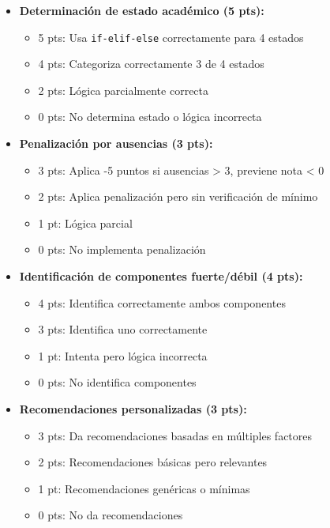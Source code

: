 \documentclass[12pt,a4paper]{article}
\begin{document}
\begin{itemize}[leftmargin=*]
    \item \textbf{Determinación de estado académico (5 pts):}
    \begin{itemize}
        \item 5 pts: Usa \texttt{if-elif-else} correctamente para 4 estados
        \item 4 pts: Categoriza correctamente 3 de 4 estados
        \item 2 pts: Lógica parcialmente correcta
        \item 0 pts: No determina estado o lógica incorrecta
    \end{itemize}
    
    \item \textbf{Penalización por ausencias (3 pts):}
    \begin{itemize}
        \item 3 pts: Aplica -5 puntos si ausencias > 3, previene nota < 0
        \item 2 pts: Aplica penalización pero sin verificación de mínimo
        \item 1 pt: Lógica parcial
        \item 0 pts: No implementa penalización
    \end{itemize}
    
    \item \textbf{Identificación de componentes fuerte/débil (4 pts):}
    \begin{itemize}
        \item 4 pts: Identifica correctamente ambos componentes
        \item 3 pts: Identifica uno correctamente
        \item 1 pt: Intenta pero lógica incorrecta
        \item 0 pts: No identifica componentes
    \end{itemize}
    
    \item \textbf{Recomendaciones personalizadas (3 pts):}
    \begin{itemize}
        \item 3 pts: Da recomendaciones basadas en múltiples factores
        \item 2 pts: Recomendaciones básicas pero relevantes
        \item 1 pt: Recomendaciones genéricas o mínimas
        \item 0 pts: No da recomendaciones
    \end{itemize}
\end{itemize}
\end{document}
